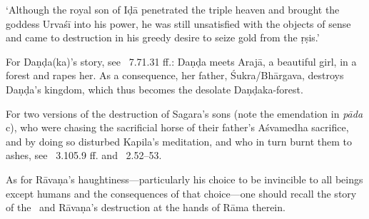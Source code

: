 {{ 
  `Although the royal son of Iḍā penetrated the triple heaven and brought
  the goddess Urvaśī into his power, he was still unsatisfied with the 
  objects of sense and came to destruction in his greedy desire to seize
  gold from the ṛṣis.'
  
 
  For Daṇḍa{\rm (}ka{\rm )}'s story, see \RAMAYANA\ 7.71.31 ff.:
  Daṇḍa meets Arajā, a beautiful girl, in a forest and rapes her. As a consequence, 
  her father, Śukra/Bhārgava, destroys Daṇḍa's kingdom, which thus
  becomes the desolate Daṇḍaka-forest.
 
  
 
  For two versions of the destruction of
  Sagara's sons {\rm (}note the emendation in \textit{pāda} c{\rm )}, 
  who were chasing the sacrificial horse of their father's Aśvamedha sacrifice,
  and by doing so disturbed Kapila's meditation, and who in turn burnt them to ashes,
  see \MBH~3.105.9 ff. and \BrahmandaPur\ 2.52--53.
 
  
 
  As for Rāvaṇa's haughtiness---particularly his choice to be invincible to all 
  beings except humans and the consequences of that choice---one should recall the 
  story of the \Ramayana\ and Rāvaṇa's destruction at the hands of Rāma therein.
}}


